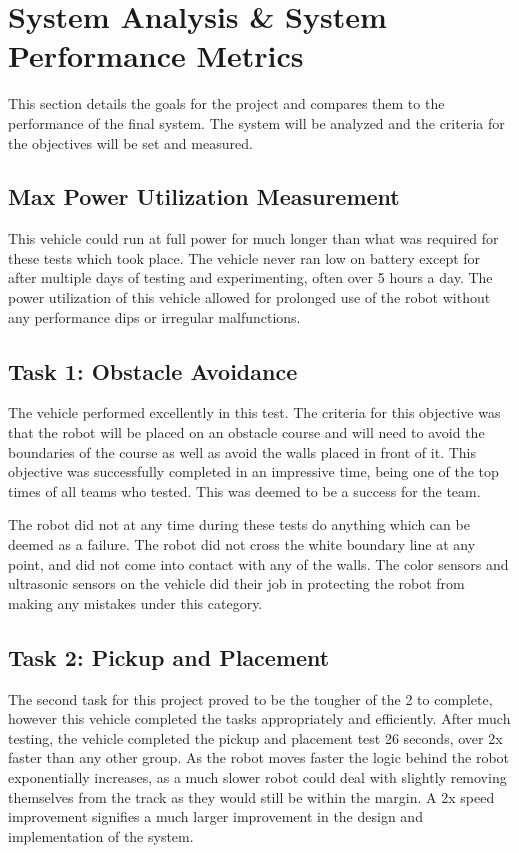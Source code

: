 \documentclass[11pt]{report}
\begin{document}
\chapter{System Analysis \& System Performance Metrics}\label{ch:system-analysis}
This section details the goals for the project and compares them to the performance of the final system. The system will be analyzed and the criteria for the objectives will be set and measured. 

\section{Max Power Utilization Measurement}
This vehicle could run at full power for much longer than what was required for these tests which took place. The vehicle never ran low on battery except for after multiple days of testing and experimenting, often over 5 hours a day. The power utilization of this vehicle allowed for prolonged use of the robot without any performance dips or irregular malfunctions. 
\section{Task 1: Obstacle Avoidance}
The vehicle performed excellently in this test. The criteria for this objective was that the robot will be placed on an obstacle course and will need to avoid the boundaries of the course as well as avoid the walls placed in front of it. This objective was successfully completed in an impressive time, being one of the top times of all teams who tested. This was deemed to be a success for the team. 
\par The robot did not at any time during these tests do anything which can be deemed as a failure. The robot did not cross the white boundary line at any point, and did not come into contact with any of the walls. The color sensors and ultrasonic sensors on the vehicle did their job in protecting the robot from making any mistakes under this category.
\section{Task 2: Pickup and Placement}
The second task for this project proved to be the tougher of the 2 to complete, however this vehicle completed the tasks appropriately and efficiently. After much testing, the vehicle completed the pickup and placement test 26 seconds, over 2x faster than any other group. As the robot moves faster the logic behind the robot exponentially increases, as a much slower robot could deal with slightly removing themselves from the track as they would still be within the margin. A 2x speed improvement signifies a much larger improvement in the design and implementation of the system.
\end{document}
